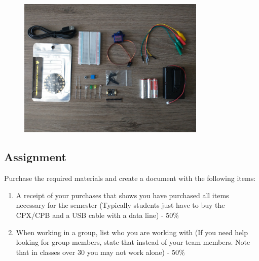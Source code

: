 \begin{figure}[H]
  \begin{center}
    \includegraphics[width=0.8\textwidth]{Figures/components.png}
  \end{center}
\end{figure}

\subsection{Assignment}
Purchase the required materials and create a document with the following items:
\begin{enumerate}[itemsep=-5pt]
\item A receipt of your purchases that shows you have purchased all items necessary for the semester (Typically students just have to buy the CPX/CPB and a USB cable with a data line) - 50\%
\item When working in a group, list who you are working with (If you need help looking for group members, state that instead of your team members. Note that in classes over 30 you may not work alone) - 50\%
\end{enumerate}


